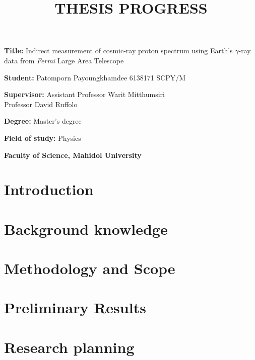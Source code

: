 \documentclass[12pt, a4paper]{article}
\title{THESIS PROGRESS}
\author{}
\date{}
\newcommand{\namelistlabel}[1]{\mbox{#1}\hfil}
\newenvironment{namelist}[1]{%
\begin{list}{}
    {
        \let\makelabel\namelistlabel
        \settowidth{\labelwidth}{#1}
        \setlength{\leftmargin}{1.1\labelwidth}
    }
  }{%
\end{list}}
\begin{document}
\maketitle

\begin{namelist}{xxxxxxxxxxxx}
\item[{\bf Title:}]
Indirect measurement of cosmic-ray proton spectrum using Earth's $\gamma$-ray data from \textit{Fermi} Large Area Telescope
\item[{\bf Student:}]
	Patomporn Payoungkhamdee 6138171 SCPY/M
\item[{\bf Supervisor:}]
  Assistant Professor Warit Mitthumsiri \\
  Professor David Ruffolo
\item[{\bf Degree:}]
	Master's degree
\item[{\bf Field of study:}]
	Physics
\item[{\bf Faculty of Science,  Mahidol University }]
\end{namelist}

\section{Introduction}


\section{Background knowledge}


\section{Methodology and Scope}


\section{Preliminary Results}


\newpage 
\section{Research planning}





\end{document}
